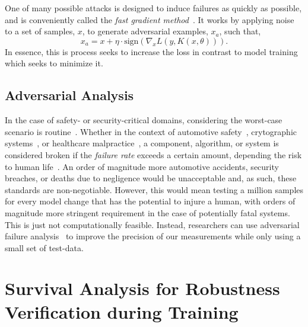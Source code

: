 \documentclass[conference]{IEEEtran}
\begin{document}
One of many possible attacks is designed to induce failures as quickly as possible, and is  conveniently called the \textit{fast gradient method}~\cite{fgm}. It works by applying noise to a set of samples, $x$, to generate adversarial examples, $x_a$, such that,
\begin{equation}
x_a = x + \eta \cdot \mathrm{sign}(\nabla_x L(y, K(x, \theta))).
\label{eq:fgm}
\end{equation}
In essence, this is process seeks to increase the loss  in contrast to model training which seeks to minimize it.


\subsection{Adversarial Analysis}

In the case of safety- or security-critical domains, considering the worst-case scenario is routine~\cite{sajid2013cloud}. Whether in the context of automotive safety~\cite{ai_automotive}, crytographic systems~\cite{leurent2020sha,kamal2017study}, or healthcare malpractice~\cite{ai_medical_imaging}, a component, algorithm, or system is considered broken if the \textit{failure rate} exceeds a certain amount, depending the risk to human life~\cite{iso26262}. An order of magnitude more automotive accidents, security breaches, or deaths due to negligence would be unacceptable and, as such, these standards are non-negotiable. However, this would mean testing a million samples for every model change that has the potential to injure a human, with orders of magnitude more stringent requirement in the case of potentially fatal systems. This is just not computationally feasible. Instead, researchers can use adversarial failure analysis~\cite{carlini_towards_2017,biggio_evasion_2013,meyers} to improve the precision of our measurements while only using a small set of test-data.





\section{Survival Analysis for Robustness Verification during Training}
\label{afr}
\end{document}
